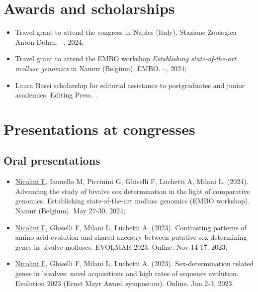 \section*{Awards and scholarships}
\begin{itemize}
    \item Travel grant to attend the  congress in Naples (Italy). Stazione Zoologica Anton Dohrn.  --, 2024;
    \item Travel grant to attend the EMBO workshop \textit{Establishing state-of-the-art mollusc genomics} in Namur (Belgium). EMBO.  --, 2024;
    \item Laura Bassi scholarship for editorial assistance to postgraduates and junior academics. Editing Press. .
\end{itemize}

\section*{Presentations at congresses}
\subsection*{Oral presentations}
\begin{itemize}
    \item \underline{Nicolini F}, Iannello M, Piccinini G, Ghiselli F, Luchetti A, Milani L. (2024). Advancing the study of bivalve sex determination in the light of comparative genomics. Establishing state-of-the-art mollusc genomics (EMBO workshop). Namur (Belgium). May 27-30, 2024;
    \item \underline{Nicolini F}, Ghiselli F, Milani L, Luchetti A. (2023). Contrasting patterns of amino acid evolution and shared ancestry between putative sex-determining genes in bivalve molluscs. EVOLMAR 2023. Online. Nov 14-17, 2023;
    \item \underline{Nicolini F}, Ghiselli F, Milani L, Luchetti A. (2023). Sex-determination related genes in bivalves: novel acquisitions and high rates of sequence evolution. Evolution 2023 (Ernst Mayr Award symposium). Online. Jun 2-3, 2023.
\end{itemize}

